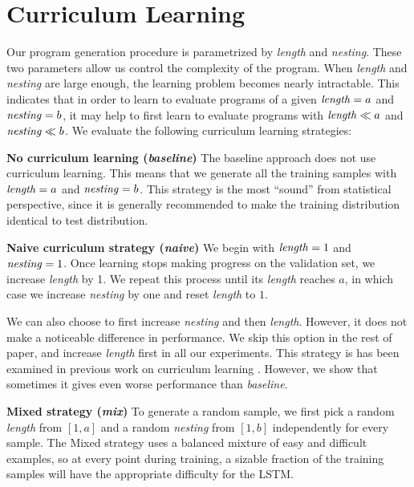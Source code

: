 \section{Curriculum Learning}

\label{sec:curriculum}

Our program generation procedure is parametrized by \textit{length} and \textit{nesting}. 
These two parameters allow us control the complexity of the program. When 
 \textit{length} and \textit{nesting} are large enough, the learning problem becomes nearly intractable. This indicates that in order to learn to evaluate programs of a given $\text{\textit{length}}=a$ and $\text{\textit{nesting}}=b$,
it may help to first learn to evaluate programs with $\text{\textit{length}} \ll a$ and $\text{\textit{nesting}} \ll b$. We evaluate the following curriculum learning strategies:

{\bf No curriculum learning (\textit{baseline})}
The baseline approach does not use curriculum learning. This means that we generate all the training samples with $\text{\textit{length}}=a$ and $\text{\textit{nesting}}=b$. 
This strategy is the most ``sound'' from statistical perspective, since it is generally recommended to make the training distribution identical to test distribution.

{\bf Naive curriculum strategy (\textit{naive})}
We begin with $\text{\textit{length}}=1$ and $\text{\textit{nesting}}=1$. 
Once learning stops making progress on the validation set, we increase \textit{length} by 1.  We repeat this process until its \textit{length} reaches $a$, in which case we increase \textit{nesting} by one and reset \textit{length} to $1$.

We can also choose to first increase \textit{nesting} and then \textit{length}. However, it does not make a noticeable difference in performance. We skip this option in the rest of paper, and increase \textit{length} first in all our experiments. This strategy is has been examined in previous work on curriculum learning \citep{bengio2009curriculum}. However, we show that sometimes it gives even worse performance than \textit{baseline}.

{\bf Mixed strategy (\textit{mix})}
To generate a random sample, we first pick a random \textit{length} from $[1, a]$ and a random \textit{nesting} from $[1, b]$ independently for every sample. The Mixed strategy uses a balanced mixture of easy and difficult examples, so at every point during training, a sizable fraction of the training samples will have the appropriate difficulty for the LSTM. 

